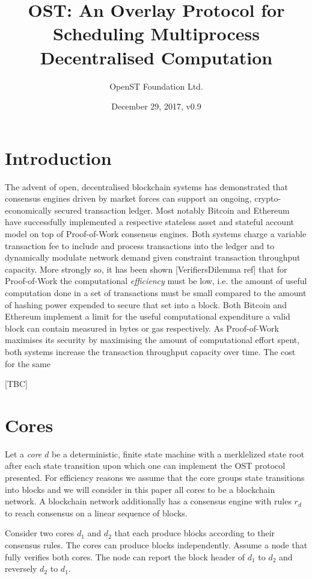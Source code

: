 \documentclass[12pt,a4paper, twocolumn]{article}
\title{{\sc OST: An Overlay Protocol for Scheduling Multiprocess Decentralised Computation}}
\author{OpenST Foundation Ltd.}
\date{December 29, 2017, v0.9}
\begin{document}
\maketitle

\section{Introduction}

The advent of open, decentralised blockchain systems has demonstrated that consensus engines driven by market forces can support an ongoing, crypto-economically secured transaction ledger.  Most notably Bitcoin and Ethereum have successfully implemented a respective stateless asset and stateful account model on top of Proof-of-Work consensus engines.  Both systems charge a variable transaction fee to include and process transactions into the ledger and to dynamically modulate network demand given  constraint transaction throughput capacity.  More strongly so, it has been shown [VerifiersDilemma ref] that for Proof-of-Work the computational \emph{efficiency} must be low, i.e. the amount of useful computation done in a set of transactions must be small compared to the amount of hashing power expended to secure that set into a block.
Both Bitcoin and Ethereum implement a limit for the useful computational expenditure a valid block can contain measured in bytes or gas respectively.  As Proof-of-Work maximises its security by maximising the amount of computational effort spent, both systems increase the transaction throughput capacity over time.  The cost for the same 

[TBC]

\section{Cores}

Let a \emph{core} $d$ be a deterministic, finite state machine with a merklelized state root after each state transition upon which one can implement the OST protocol presented. For efficiency reasons we assume that the core groups state transitions into blocks and we will consider in this paper all cores to be a blockchain network.  A blockchain network additionally has a consensus engine with rules $r_d$ to reach consensus on a linear sequence of blocks.

Consider two cores $d_1$ and $d_2$ that each produce blocks according to their consensus rules.  The cores can produce blocks independently. Assume a node that fully verifies both cores.  The node can report the block header of $d_1$ to $d_2$ and reversely $d_2$ to $d_1$.
\end{document}
